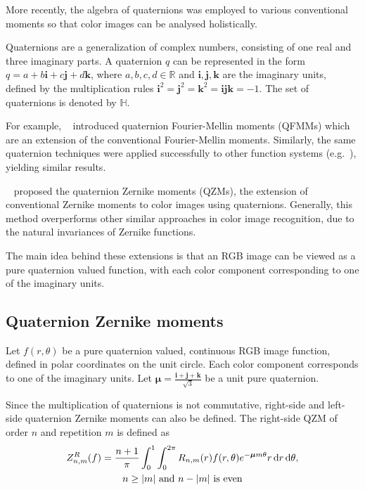 More recently, the algebra of quaternions was employed to various conventional moments so that color images can be analysed holistically.

Quaternions are a generalization of complex numbers, consisting of one real and three imaginary parts. A quaternion $q$ can be represented in the form $q = a + b\mathbf{i} + c\mathbf{j} + d\mathbf{k}$, where $a,b,c,d \in \mathds{R}$ and $\mathbf{i}, \mathbf{j}, \mathbf{k}$ are the imaginary units, defined by the multiplication rules $\mathbf{i}^2 = \mathbf{j}^2 = \mathbf{k}^2 = \mathbf{ijk} = -1$. The set of quaternions is denoted by $\mathds{H}$.

For example, \citeauthor{qfmm}~\cite{qfmm} introduced quaternion Fourier-Mellin moments (QFMMs) which are an extension of the conventional Fourier-Mellin moments. Similarly, the same quaternion techniques were applied successfully to other function systems (e.g.~\cite{bessel-fourier, chebyshev-fourier}), yielding similar results.

\citeauthor{qzm}~\cite{qzm,qzmi} proposed the quaternion Zernike moments (QZMs), the extension of conventional Zernike moments to color images using quaternions. Generally, this method overperforms other similar approaches in color image recognition, due to the natural invariances of Zernike functions.

The main idea behind these extensions is that an RGB image can be viewed as a pure quaternion valued function, with each color component corresponding to one of the imaginary units.

\subsection{Quaternion Zernike moments}
Let $f(r,\theta)$ be a pure quaternion valued, continuous RGB image function, defined in polar coordinates on the unit circle. Each color component corresponds to one of the imaginary units. Let $\bm{\mu} = \frac{\mathbf{i} + \mathbf{j} + \mathbf{k}}{\sqrt{3}}$ be a unit pure quaternion.

Since the multiplication of quaternions is not commutative, right-side and left-side quaternion Zernike moments can also be defined. The right-side QZM of order $n$ and repetition $m$ is defined as
\begin{gather*}
  Z_{n,m}^R(f) = \frac{n + 1}{\pi}\int_0^1\int_0^{2\pi}R_{n,m}(r)f(r,\theta)e^{-\bm{\mu}m\theta}r\dif r\dif\theta, \\
  n \geq |m| \text{  and  } n - |m| \text{  is even}
\end{gather*}

